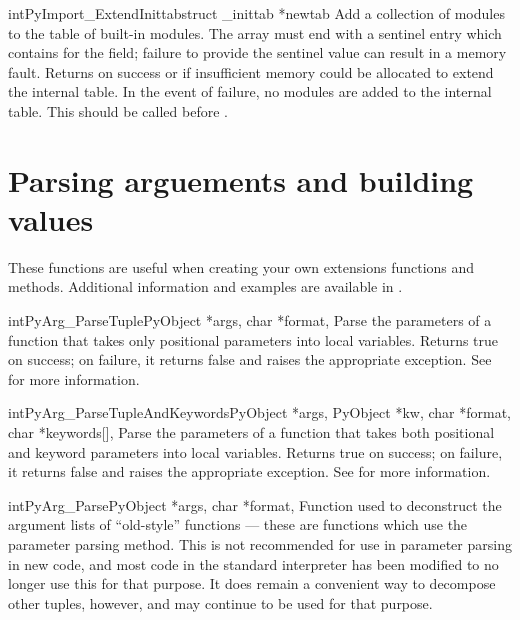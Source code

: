 \documentclass{manual}
\begin{document}
\begin{cfuncdesc}{int}{PyImport_ExtendInittab}{struct _inittab *newtab}
Add a collection of modules to the table of built-in modules.  The
 array must end with a sentinel entry which contains
\NULL{} for the  field; failure to provide the sentinel
value can result in a memory fault.  Returns  on success or
 if insufficient memory could be allocated to extend the
internal table.  In the event of failure, no modules are added to the
internal table.  This should be called before
.
\end{cfuncdesc}


\section{Parsing arguements and building values
         \label{arg-parsing}}

These functions are useful when creating your own extensions functions
and methods.  Additional information and examples are available in
.

\begin{cfuncdesc}{int}{PyArg_ParseTuple}{PyObject *args, char *format,
                                         \moreargs}
  Parse the parameters of a function that takes only positional
  parameters into local variables.  Returns true on success; on
  failure, it returns false and raises the appropriate exception.  See
   for more information.
\end{cfuncdesc}

\begin{cfuncdesc}{int}{PyArg_ParseTupleAndKeywords}{PyObject *args,
                       PyObject *kw, char *format, char *keywords[],
                       \moreargs}
  Parse the parameters of a function that takes both positional and
  keyword parameters into local variables.  Returns true on success;
  on failure, it returns false and raises the appropriate exception.
  See  for more information.
\end{cfuncdesc}

\begin{cfuncdesc}{int}{PyArg_Parse}{PyObject *args, char *format,
                                    \moreargs}
  Function used to deconstruct the argument lists of ``old-style''
  functions --- these are functions which use the
   parameter parsing method.  This is not
  recommended for use in parameter parsing in new code, and most code
  in the standard interpreter has been modified to no longer use this
  for that purpose.  It does remain a convenient way to decompose
  other tuples, however, and may continue to be used for that
  purpose.
\end{cfuncdesc}
\end{document}

